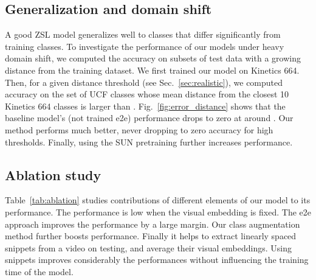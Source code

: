 \documentclass[10pt,twocolumn,letterpaper]{article}
\begin{document}
\subsection{Generalization and domain shift}
A good ZSL model generalizes well to classes that differ significantly from training classes. To investigate the performance of our models under heavy domain shift, we computed the accuracy on subsets of test data with a growing distance from the training dataset. We first trained our model on Kinetics 664. Then, for a given distance threshold  (see Sec.~\ref{sec:realistic}), we computed accuracy on the set of UCF classes whose mean distance from the closest 10 Kinetics 664 classes is larger than . Fig.~\ref{fig:error_distance} shows that the baseline model's (not trained e2e) performance drops to zero at around . Our method performs much better, never dropping to zero accuracy for high thresholds. Finally, using the SUN pretraining further increases performance.

\subsection{Ablation study}
Table~\ref{tab:ablation} studies contributions of different elements of our model to its performance. The performance is low when the visual embedding is fixed. The e2e approach improves the performance by a large margin. Our class augmentation method further boosts performance. Finally it helps to extract linearly spaced snippets from a video on testing, and average their visual embeddings. Using  snippets improves considerably the performances without influencing the training time of the model.
\end{document}
